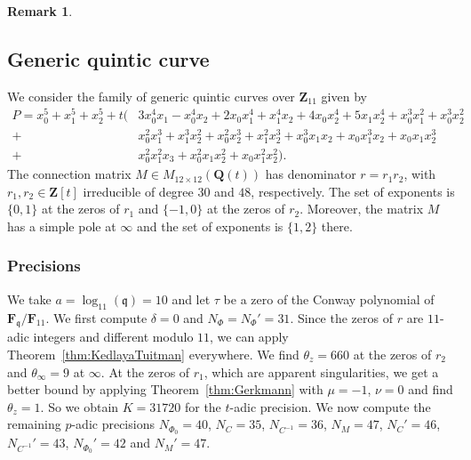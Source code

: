 \documentclass[a4paper,11pt]{article}
\numberwithin{equation}{section}
\newcommand{\ZZ}{\mathbf{Z}} %
\newcommand{\QQ}{\mathbf{Q}} %
\newcommand{\FF}{\mathbf{F}} %
\theoremstyle{definition}
\newtheorem{rem}[thm]{Remark}
\begin{document}
\begin{rem}
\end{rem}

\subsection{Generic quintic curve}

We consider the family of generic quintic curves over $\ZZ_{11}$ given by 
\begin{equation*}
\begin{split}
P=x_0^5 + x_1^5 + x_2^5
+ t \bigl( & 3x_0^4 x_1-x_0^4 x_2+2 x_0 x_1^4+x_1^4 x_2+4 x_0 x_2^4+5 x_1 x_2^4 + x_0^3 x_1^2+x_0^3 x_2^2 \\ 
           + & x_0^2 x_1^3+ x_1^3 x_2^2+x_0^2 x_2^3+x_1^2 x_2^3 + x_0^3 x_1 x_2 + x_0 x_1^3 x_2 + x_0 x_1 x_2^3 \\ 
           + & x_0^2 x_1^2 x_3 + x_0^2 x_1 x_2^2 + x_0 x_1^2 x_2^2 \bigr).
\end{split}
\end{equation*}
The connection matrix $M \in M_{12 \times 12}(\QQ(t))$ has denominator $r=r_1 r_2$, with $r_1,r_2 \in \ZZ[t]$ irreducible
of degree $30$ and $48$, respectively. The set of exponents is $\{ 0,1 \}$ at the zeros of $r_1$ and $\{ -1,0 \}$ at the
zeros of $r_2$. Moreover, the matrix $M$ has a simple pole at $\infty$ and the set of exponents is $\{1,2\}$ there.

\subsubsection{Precisions}

We take $a=\log_{11}(\mathfrak{q})=10$ and let $\tau$ be a zero of the Conway polynomial of 
$\FF_{\mathfrak{q}}/\FF_{11}$. We first compute $\delta=0$ and $N_{\Phi}=N_{\Phi}'=31$.
Since the zeros of $r$ are $11$-adic integers and different modulo $11$, we can apply 
Theorem~\ref{thm:KedlayaTuitman} everywhere. We find $\theta_z=660$ at the zeros of $r_2$
and $\theta_{\infty}=9$ at $\infty$. At the zeros of $r_1$, which are apparent singularities, 
we get a better bound by applying Theorem~\ref{thm:Gerkmann} with $\mu=-1$, $\nu=0$ and find 
$\theta_z=1$. So we obtain $K=31720$ for the $t$-adic precision. We now compute the remaining 
$p$-adic precisions $N_{\Phi_0}=40$, $N_C=35$, $N_{C^{-1}}=36$, $N_M=47$, $N_C'=46$, $N_{C^{-1}}'=43$, 
$N_{\Phi_0}'=42$ and $N_M'=47$.
\end{document}
